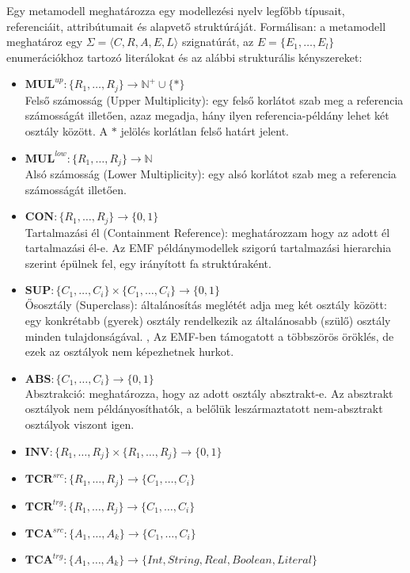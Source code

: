 \begin{definition}[Metamodell]
Egy metamodell meghatározza egy modellezési nyelv legfőbb típusait, referenciáit, attribútumait és alapvető struktúráját. Formálisan: a metamodell meghatároz egy $\Sigma = \langle\mathit{C}, \mathit{R}, \mathit{A}, \mathit{E}, \mathit{L}\rangle$ szignatúrát, az $E = \{E_1, \ldots, E_l\}$ enumerációkhoz tartozó literálokat és az alábbi strukturális kényszereket:
\begin{itemize}
  \item $ \mathit{\textbf{MUL}}^\mathit{up}:  \{R_1, \ldots, R_j \} \rightarrow \mathbb{N}^+ \cup  \{*\} $ \\
  	Felső számosság (Upper Multiplicity): egy felső korlátot szab meg a referencia számosságát illetően, azaz megadja, hány ilyen referencia-példány lehet két osztály között.
  	A $ * $ jelölés korlátlan felső határt jelent.

  
  \item $ \mathit{\textbf{MUL}}^\mathit{low}:  \{R_1, \ldots, R_j \} \rightarrow \mathbb{N} $ \\
  Alsó számosság (Lower Multiplicity): egy alsó korlátot szab meg a referencia számosságát illetően.
  
  \item $ \mathit{\textbf{CON}}: \{R_1, \ldots, R_j \} \rightarrow \{0, 1\} $ \\
  	Tartalmazási él (Containment Reference): meghatározzam hogy az adott él tartalmazási él-e.
  	Az EMF példánymodellek szigorú tartalmazási hierarchia szerint épülnek fel, egy irányított fa struktúraként.
	
  \item $ \mathit{\textbf{SUP}}: \{C_1, \ldots, C_i\} \times \{C_1, \ldots, C_i\} \rightarrow \{0, 1\} $ \\
	Ősosztály (Superclass): általánosítás meglétét adja meg két osztály között: egy konkrétabb (gyerek) osztály rendelkezik az általánosabb (szülő) osztály minden tulajdonságával.
	,
	Az EMF-ben támogatott a többszörös öröklés, de ezek az osztályok nem képezhetnek hurkot.
  \item $ \mathit{\textbf{ABS}}: \{C_1, \ldots, C_i \} \rightarrow \{0, 1\} $ \\
	Absztrakció: meghatározza, hogy az adott osztály absztrakt-e. Az absztrakt osztályok nem példányosíthatók, a belőlük leszármaztatott nem-absztrakt osztályok viszont igen.

  \item $ \mathit{\textbf{INV}}: \{R_1, \ldots, R_j \} \times \{R_1, \ldots, R_j\} \rightarrow \{0, 1\} $
  \item $ \mathit{\textbf{TCR}}^\mathit{src}: \{R_1, \ldots, R_j \} \rightarrow \{C_1, \ldots, C_i\} $  
  \item $ \mathit{\textbf{TCR}}^\mathit{trg}: \{R_1, \ldots, R_j \} \rightarrow \{C_1, \ldots, C_i\} $
  \item $ \mathit{\textbf{TCA}}^\mathit{src}: \{A_1, \ldots, A_k\} \rightarrow \{C_1, \ldots, C_i\} $
  \item $ \mathit{\textbf{TCA}}^\mathit{trg}: \{A_1, \ldots, A_k\} \rightarrow \{\mathit{Int, String, Real, Boolean, Literal}\}$


\end{itemize}
\end{definition}
